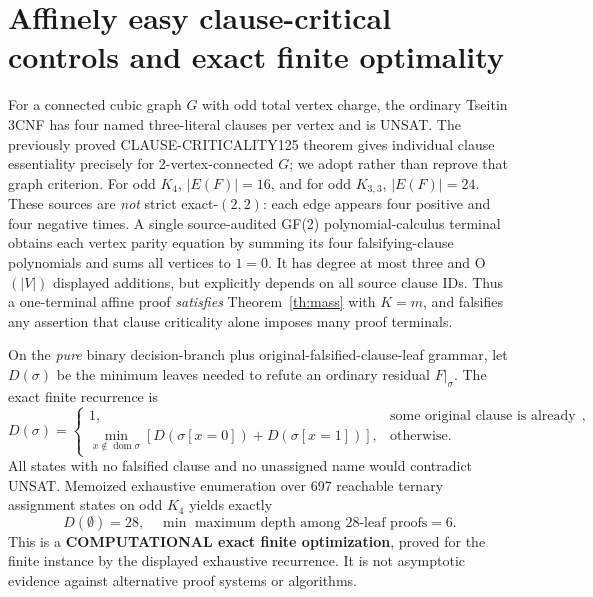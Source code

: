 \documentclass[11pt]{article}
\begin{document}
\section{Affinely easy clause-critical controls and exact finite optimality}
For a connected cubic graph $G$ with odd total vertex charge, the ordinary Tseitin 3CNF has four named three-literal clauses per vertex and is UNSAT. The previously proved CLAUSE-CRITICALITY125 theorem gives individual clause essentiality precisely for 2-vertex-connected $G$; we adopt rather than reprove that graph criterion. For odd $K_4$, $|E(F)|=16$, and for odd $K_{3,3}$, $|E(F)|=24$. These sources are \emph{not} strict exact-$(2,2)$: each edge appears four positive and four negative times. A single source-audited GF(2) polynomial-calculus terminal obtains each vertex parity equation by summing its four falsifying-clause polynomials and sums all vertices to $1=0$. It has degree at most three and O$(|V|)$ displayed additions, but explicitly depends on all source clause IDs. Thus a one-terminal affine proof \emph{satisfies} Theorem~\ref{th:mass} with $K=m$, and falsifies any assertion that clause criticality alone imposes many proof terminals.

On the \emph{pure} binary decision-branch plus original-falsified-clause-leaf grammar, let $D(\sigma)$ be the minimum leaves needed to refute an ordinary residual $F|_\sigma$. The exact finite recurrence is
\[
D(\sigma)=
\begin{cases}
1,&\text{some original clause is already falsified},\\
\displaystyle\min_{x\notin\operatorname{dom}\sigma}
[D(\sigma[x=0])+D(\sigma[x=1])],&\text{otherwise}.
\end{cases}
\]
All states with no falsified clause and no unassigned name would contradict UNSAT. Memoized exhaustive enumeration over 697 reachable ternary assignment states on odd $K_4$ yields exactly
\[
\boxed{D(\emptyset)=28,\quad \min\text{ maximum depth among 28-leaf proofs}=6.}
\]
This is a \textbf{COMPUTATIONAL exact finite optimization}, proved for the finite instance by the displayed exhaustive recurrence. It is not asymptotic evidence against alternative proof systems or algorithms.
\end{document}
